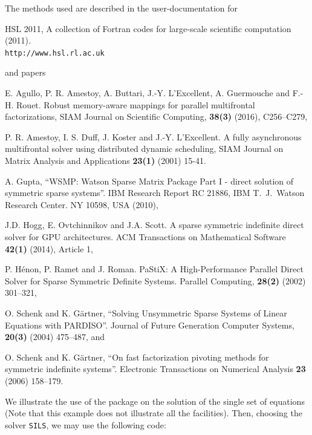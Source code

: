 \documentclass{galahad}
\begin{document}
\vspace*{1mm}

\galreferences
\vspace*{1mm}

\noindent
The methods used are described in the user-documentation for
\vspace*{1mm}

\noindent
HSL 2011, A collection of {F}ortran codes for large-scale scientific
computation (2011). \\
 {\tt http://www.hsl.rl.ac.uk}

\noindent
and papers

\noindent
E. Agullo, P. R. Amestoy, A. Buttari, J.-Y. L'Excellent, A. Guermouche 
and F.-H. Rouet.
Robust memory-aware mappings for parallel multifrontal factorizations, 
SIAM Journal on Scientific Computing, {\bf 38(3)} (2016), C256--C279,

\noindent
P. R. Amestoy, I. S. Duff, J. Koster and J.-Y. L'Excellent. 
A fully asynchronous multifrontal solver using distributed dynamic scheduling,
SIAM Journal on Matrix Analysis and Applications {\bf 23(1)} (2001) 15-41.

\noindent
A. Gupta,
``WSMP: Watson Sparse Matrix Package Part I - direct
solution of symmetric sparse systems''.
IBM Research Report RC 21886, IBM T.\ J.\ Watson Research Center.
NY 10598, USA (2010),

\noindent
J.D. Hogg, E. Ovtchinnikov and J.A. Scott. 
A sparse symmetric indefinite direct solver for GPU architectures. 
ACM Transactions on Mathematical Software {\bf 42(1)} (2014), Article 1,

\noindent
P. H\'{e}non, P. Ramet and J. Roman. 
PaStiX: A High-Performance Parallel Direct Solver for Sparse Symmetric 
Definite Systems. Parallel Computing, {\bf 28(2)} (2002) 301--321,

\noindent
O. Schenk and K. G\"{a}rtner,
``Solving Unsymmetric Sparse Systems of Linear Equations with PARDISO''.
Journal of Future Generation Computer Systems, {\bf 20(3)} (2004) 475--487, 
and

\noindent
O. Schenk and K. G\"{a}rtner,
``On fast factorization pivoting methods for symmetric indefinite systems''.
Electronic Transactions on Numerical Analysis
{\bf 23} (2006) 158--179.


\galexample
We illustrate the use of the package on the solution of the
single set of equations
(Note that this example does not illustrate all the facilities).
Then, choosing the solver {\tt SILS}, we may use the following code:
\end{document}
